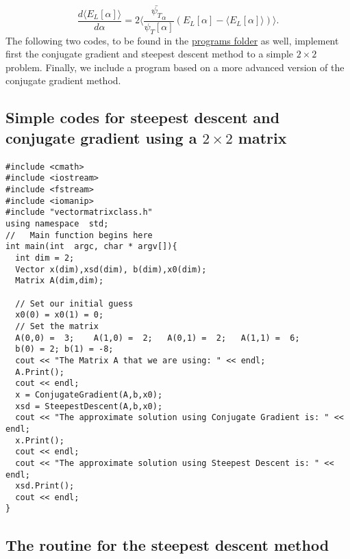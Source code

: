 \documentclass[%
twoside,                 %
final,                   %
10pt]{article}
\begin{document}
\noindent
\begin{equation*} \frac{d\langle E_{L}[\alpha] \rangle}{d\alpha}= 2\langle \frac{\bar{\psi_T}_{\alpha}}{\psi_T[\alpha]}\left(E_L[\alpha]-\langle  E_L[\alpha]\rangle\right)\rangle.
\end{equation*}
The following two codes, to be found in the \href{{https://github.com/CompPhysics/ComputationalPhysics2/tree/gh-pages/doc/pub/cg/programs/c%






\subsection*{Simple codes for  steepest descent and conjugate gradient using a $2\times 2$ matrix}

\paragraph{}
\begin{verbatim}
#include <cmath>
#include <iostream>
#include <fstream>
#include <iomanip>
#include "vectormatrixclass.h"
using namespace  std;
//   Main function begins here
int main(int  argc, char * argv[]){
  int dim = 2;
  Vector x(dim),xsd(dim), b(dim),x0(dim);
  Matrix A(dim,dim);
  
  // Set our initial guess
  x0(0) = x0(1) = 0;
  // Set the matrix  
  A(0,0) =  3;    A(1,0) =  2;   A(0,1) =  2;   A(1,1) =  6; 
  b(0) = 2; b(1) = -8;
  cout << "The Matrix A that we are using: " << endl;
  A.Print();
  cout << endl;
  x = ConjugateGradient(A,b,x0);
  xsd = SteepestDescent(A,b,x0);
  cout << "The approximate solution using Conjugate Gradient is: " << endl;
  x.Print();
  cout << endl;
  cout << "The approximate solution using Steepest Descent is: " << endl;
  xsd.Print();
  cout << endl;
}
\end{verbatim}



\subsection*{The routine for the steepest descent method}
\end{document}
